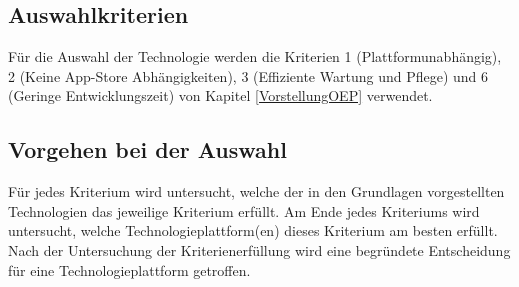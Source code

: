 \documentclass[ngerman]{article}
\begin{document}
    \subsection{Auswahlkriterien}
    Für die Auswahl der Technologie werden die Kriterien 1 (Plattformunabhängig), 2 (Keine App-Store Abhängigkeiten), 3 (Effiziente Wartung und Pflege) und 6 (Geringe Entwicklungszeit) von Kapitel \ref{VorstellungOEP} verwendet.
    \subsection{Vorgehen bei der Auswahl}
    Für jedes Kriterium wird untersucht, welche der in den Grundlagen vorgestellten Technologien das jeweilige Kriterium erfüllt. Am Ende jedes Kriteriums wird untersucht, welche Technologieplattform(en) dieses Kriterium am besten erfüllt.\\
    Nach der Untersuchung der Kriterienerfüllung wird eine begründete Entscheidung für eine Technologieplattform getroffen.
\end{document}

